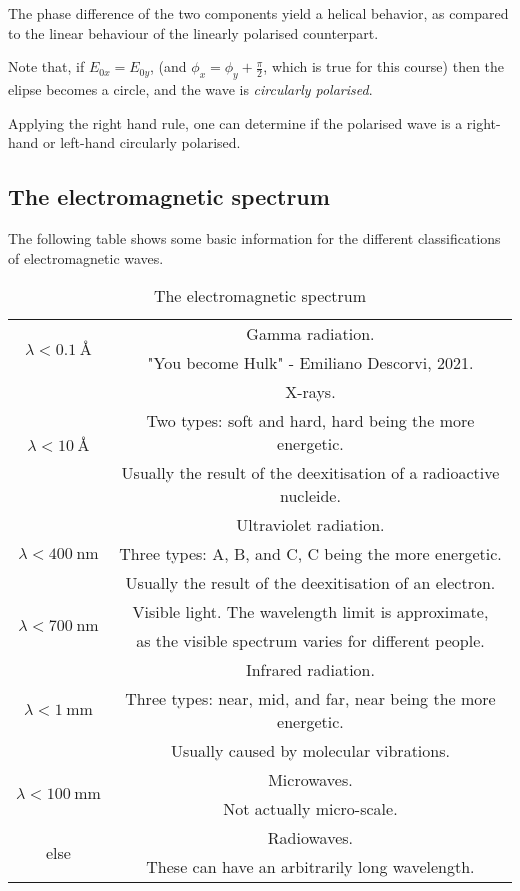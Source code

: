         The phase difference of the two components yield a helical behavior, 
        as compared to the linear behaviour of the linearly polarised counterpart.

        Note that, if $E_{0x} = E_{0y}$, (and $\phi_x = \phi_y + \frac{\pi}{2}$, which is true for this course)
        then the elipse becomes a circle, and the wave is \textit{circularly polarised}.

        Applying the right hand rule, 
        one can determine if the polarised wave is a right-hand or left-hand circularly polarised.

\subsection{The electromagnetic spectrum}
    The following table shows some basic information for the different classifications of electromagnetic waves.
    \begin{longtable}[c]{@{}c|c@{}} 
        \caption{The electromagnetic spectrum}    
        \endfirsthead
        \hline
        \multirow{2}{*}{$\displaystyle\lambda < \SI{0.1}{\angstrom}$}
         & Gamma radiation. \\
         &"You become Hulk" - Emiliano Descorvi, 2021.\\
        \hline    
        \multirow{3}{*}{$\displaystyle\lambda < \SI{10}{\angstrom}$}
         & X-rays. \\
         & Two types: soft and hard, hard being the more energetic. \\
         & Usually the result of the deexitisation of a radioactive nucleide. \\
        \hline
        \multirow{3}{*}{$\displaystyle\lambda < \SI{400}{\nano\metre}$}
         & Ultraviolet radiation. \\
         & Three types: A, B, and C, C being the more energetic. \\
         & Usually the result of the deexitisation of an electron.\\
        \hline
        \multirow{2}{*}{$\displaystyle\lambda < \SI{700}{\nano\metre}$}
         & Visible light. The wavelength limit is approximate, \\
         & as the visible spectrum varies for different people.\\
        \hline
        \multirow{3}{*}{$\displaystyle\lambda < \SI{1}{\milli\metre}$}
         & Infrared radiation. \\
         & Three types: near, mid, and far, near being the more energetic. \\
         & Usually caused by molecular vibrations.\\
        \hline
        \multirow{2}{*}{$\displaystyle\lambda < \SI{100}{\milli\metre}$}
         & Microwaves.\\
         & Not actually micro-scale.\\
        \hline
        \multirow{2}{*}{else}
         & Radiowaves. \\
         & These can have an arbitrarily long wavelength.\\
        \hline
    \end{longtable}

